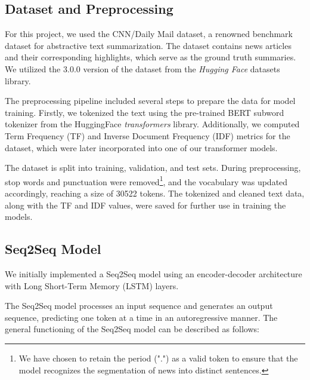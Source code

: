 \documentclass[a4paper, 11pt]{article}
\begin{document}
\subsection{Dataset and Preprocessing}

For this project, we used the CNN/Daily Mail dataset, a renowned benchmark dataset for abstractive text summarization. The dataset contains news articles and their corresponding highlights, which serve as the ground truth summaries. We utilized the 3.0.0 version of the dataset from the \textit{Hugging Face} datasets library\cite{huggingface_cnn_dailymail}.

The preprocessing pipeline included several steps to prepare the data for model training. Firstly, we tokenized the text using the pre-trained BERT subword tokenizer from the HuggingFace \textit{transformers} library\cite{BERTtokenizer}. Additionally, we computed Term Frequency (TF) and Inverse Document Frequency (IDF) metrics for the dataset\cite{nallapati2016abstractive}, which were later incorporated into one of our transformer models.

The dataset is split into training, validation, and test sets. During preprocessing, stop words and punctuation were removed\footnote{We have chosen to retain the period (".") as a valid token to ensure that the model recognizes the segmentation of news into distinct sentences.}, and the vocabulary was updated accordingly, reaching a size of 30522 tokens. The tokenized and cleaned text data, along with the TF and IDF values, were saved for further use in training the models.

\subsection{Seq2Seq Model}

We initially implemented a Seq2Seq model\cite{sutskever2014sequence} using an encoder-decoder architecture with Long Short-Term Memory (LSTM) layers\cite{lstm}.

The Seq2Seq model processes an input sequence and generates an output sequence, predicting one token at a time in an autoregressive manner. The general functioning of the Seq2Seq model can be described as follows:
\end{document}
